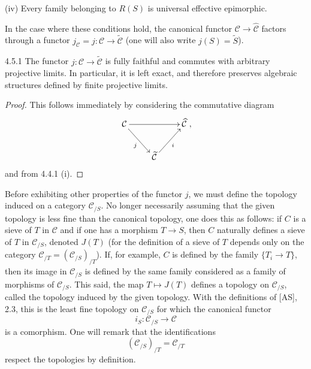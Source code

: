 (iv) Every family belonging to \(R(S)\) is universal effective epimorphic.

In the case where these conditions hold, the canonical functor
\(\mathcal C\to\widehat{\mathcal C}\) factors through a functor
\(j_{\mathcal C}=j:\mathcal C\to\widetilde{\mathcal C}\)
(one will also write \(j(S)=\widetilde S\)).

\begin{proposition}{4.5.1}\label{IV.4.5.1}
The functor \(j:\mathcal C\to\widetilde{\mathcal C}\) is fully
faithful and commutes with arbitrary projective limits.
In particular, it is left exact, and therefore preserves algebraic
structures defined by finite projective limits.
\end{proposition}
\begin{proof}
This follows immediately by considering the commutative diagram
\[
\xymatrix{
\mathcal C\ar[rr]\ar[dr]_j & & \widehat{\mathcal C}\\
 & \widetilde{\mathcal C}\ar[ur]_i & },
\]
and from 4.4.1 (i).
\end{proof}

Before exhibiting other properties of the functor \(j\), we must
define the topology induced on a category \(\mathcal C_{/S}\).
No longer necessarily assuming that the given topology is less
fine than the canonical topology, one does this as follows:
if \(C\) is a sieve of \(T\) in \(\mathcal C\) and if one has a
morphism \(T\to S\), then \(C\) naturally defines a sieve of
\(T\) in \(\mathcal C_{/S}\), denoted \(J(T)\)
(for the definition of a sieve of \(T\) depends only on the
category \(\mathcal C_{/T}=(\mathcal C_{/S})_{/T}\)).
If, for example, \(C\) is defined by the family \(\{T_i\to T\}\),
then its image in \(\mathcal C_{/S}\) is defined by the same
family considered as a family of morphisms of \(\mathcal C_{/S}\).
This said, the map \(T\mapsto J(T)\) defines a topology on
\(\mathcal C_{/S}\), called the topology induced by the given
topology. With the definitions of [AS], 2.3, this is the least
fine topology on \(\mathcal C_{/S}\) for which the canonical functor
\[
i_S:\mathcal C_{/S}\longrightarrow\mathcal C
\]
is a comorphism.
One will remark that the identifications
\[
(\mathcal C_{/S})_{/T}=\mathcal C_{/T}
\]
respect the topologies by definition.

